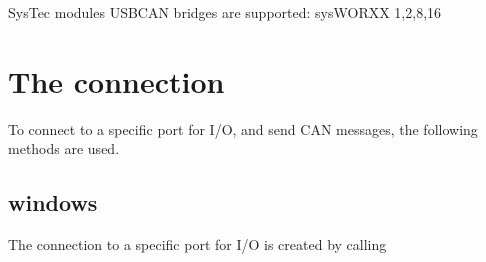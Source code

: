 \documentclass[a4paper,10pt,english]{sphinxmanual}
\begin{document}
SysTec modules USB\sphinxhyphen{}CAN bridges are supported: sysWORXX 1,2,8,16


\section{The connection}
\label{\detokenize{vendors/systec:the-connection}}
To connect to a specific port for I/O, and send CAN messages, the following methods are used.


\subsection{windows}
\label{\detokenize{vendors/systec:windows}}
The connection to a specific port for I/O is created by calling
\end{document}
